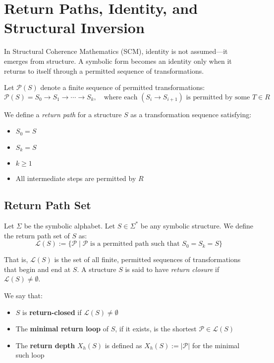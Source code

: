 \section{Return Paths, Identity, and Structural Inversion}\label{return-paths-identity-and-structural-inversion}

In Structural Coherence Mathematics (SCM), identity is not assumed---it emerges from structure. A symbolic form becomes an identity only when it returns to itself through a permitted sequence of transformations.

\begin{definition} \label{def:return-path}
Let $\mathcal{P}(S)$ denote a finite sequence of permitted transformations:
\begin{equation} \label{eq:return-sequence}
\mathcal{P}(S) = S_0 \rightarrow S_1 \rightarrow \cdots \rightarrow S_k,
\quad \text{where each } (S_i \rightarrow S_{i+1}) \text{ is permitted by some } T \in R
\end{equation}

We define a \textit{return path} for a structure $S$ as a transformation sequence satisfying:
\begin{itemize}
  \item $S_0 = S$
  \item $S_k = S$
  \item $k \geq 1$
  \item All intermediate steps are permitted by $R$
\end{itemize}
\end{definition}

\subsection*{Return Path Set} \label{return-path-set}
Let $\Sigma$ be the symbolic alphabet. Let $S \in \Sigma^*$ be any symbolic structure.  
We define the return path set of $S$ as:
\begin{equation} \label{eq:return-path-set}
\mathcal{L}(S) := \{ \mathcal{P} \mid \mathcal{P} \text{ is a permitted path such that } S_0 = S_k = S \}
\end{equation}

That is, $\mathcal{L}(S)$ is the set of all finite, permitted sequences of transformations that begin and end at $S$.  
A structure $S$ is said to have \textit{return closure} if $\mathcal{L}(S) \neq \emptyset$.

We say that:
\begin{itemize}
  \item $S$ is \textbf{return-closed} if $\mathcal{L}(S) \neq \emptyset$
  \item The \textbf{minimal return loop} of $S$, if it exists, is the shortest $\mathcal{P} \in \mathcal{L}(S)$
  \item The \textbf{return depth} $X_h(S)$ is defined as $X_h(S) := |\mathcal{P}|$ for the minimal such loop
\end{itemize}

